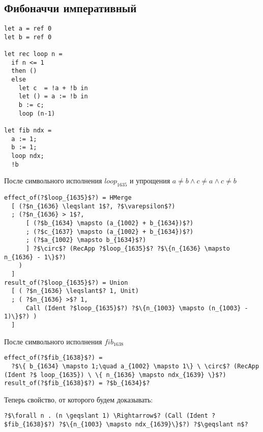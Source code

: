 \documentclass[a5paper,12pt]{article}
\begin{document}
% 
% 
% 

\subsection{Фибоначчи императивный}
\begin{verbatim}  
let a = ref 0
let b = ref 0

let rec loop n = 
  if n <= 1
  then ()
  else 
    let c  = !a + !b in 
    let () = a := !b in
    b := c;
    loop (n-1) 
 
let fib ndx = 
  a := 1;
  b := 1;
  loop ndx;
  !b
\end{verbatim}
После символьного исполнения $loop_{1635}$ и упрощения $a \neq b \wedge c \neq a \wedge c \neq b$
\begin{verbatim}
effect_of(?$loop_{1635}$?) = HMerge 
  [ (?$n_{1636} \leqslant 1$?, ?$\varepsilon$?)
  ; (?$n_{1636} > 1$?,
      [ (?$b_{1634} \mapsto (a_{1002} + b_{1634})$?)
      ; (?$c_{1637} \mapsto (a_{1002} + b_{1634})$?)
      ; (?$a_{1002} \mapsto b_{1634}$?)          
      ] ?$\circ$? (RecApp ?$loop_{1635}$? ?$\{n_{1636} \mapsto n_{1636} - 1\}$?)
    )
  ]
result_of(?$loop_{1635}$?) = Union 
  [ ( ?$n_{1636} \leqslant$? 1, Unit)     
  ; ( ?$n_{1636} >$? 1,
      Call (Ident ?$loop_{1635}$?) ?$\{n_{1003} \mapsto (n_{1003} - 1)\}$?) )
  ]
\end{verbatim}
После символьного исполнения $fib_{1638}$
\begin{verbatim}
effect_of(?$fib_{1638}$?) = 
  ?$\{ b_{1634} \mapsto 1;\quad a_{1002} \mapsto 1\} \ \circ$? (RecApp (Ident ?$ loop_{1635}) \ \{ n_{1636} \mapsto ndx_{1639} \}$?)
result_of(?$fib_{1638}$?) = ?$b_{1634}$? 
\end{verbatim}

Теперь свойство, от которого будем доказывать: 
\begin{verbatim}
?$\forall n . (n \geqslant 1) \Rightarrow$? (Call (Ident ?$fib_{1638}$?) ?$\{n_{1003} \mapsto ndx_{1639}\}$?) ?$\geqslant n$?
\end{verbatim}
\end{document}
